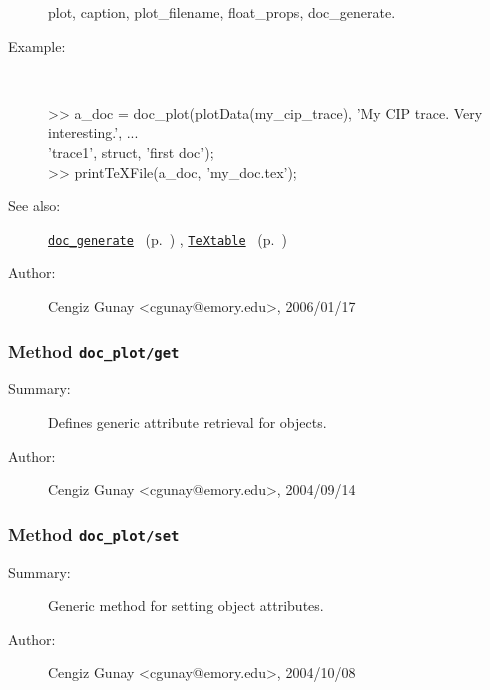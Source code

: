 \begin{description}
	plot, caption, plot\_filename, float\_props, doc\_generate.
%
\item[Example:]~
\begin{lyxcode}   >> a\_doc = doc\_plot(plotData(my\_cip\_trace), 'My CIP trace. Very interesting.', ...\\%
                       'trace1', struct, 'first doc');\\%
   >> printTeXFile(a\_doc, 'my\_doc.tex'); %
\end{lyxcode}
%
\item[See also:]%
\hyperlink{ref_doc_generate}{\texttt{doc\_generate}}%
\ (p.~\pageref{ref_doc_generate})%
%
, \hyperlink{ref_TeXtable}{\texttt{TeXtable}}%
\ (p.~\pageref{ref_TeXtable})%
%
%
\item[Author:]%
Cengiz Gunay <cgunay@emory.edu>, 2006/01/17%
\end{description}
\methodline%
\subsubsection[Method \texttt{get}]{Method \texttt{doc\_plot/get}}%
%
\label{ref_doc_plot__get}%
\hypertarget{ref_doc_plot__get}{}%
\begin{description}
\item[Summary:]Defines generic attribute retrieval for objects.
%
%
%
%
%
%
%
\item[Author:]%
Cengiz Gunay <cgunay@emory.edu>, 2004/09/14%
\end{description}
\methodline%
\subsubsection[Method \texttt{set}]{Method \texttt{doc\_plot/set}}%
%
\label{ref_doc_plot__set}%
\hypertarget{ref_doc_plot__set}{}%
\begin{description}
\item[Summary:]Generic method for setting object attributes.
%
%
%
%
%
%
%
\item[Author:]%
Cengiz Gunay <cgunay@emory.edu>, 2004/10/08%
\end{description}
\methodline%
